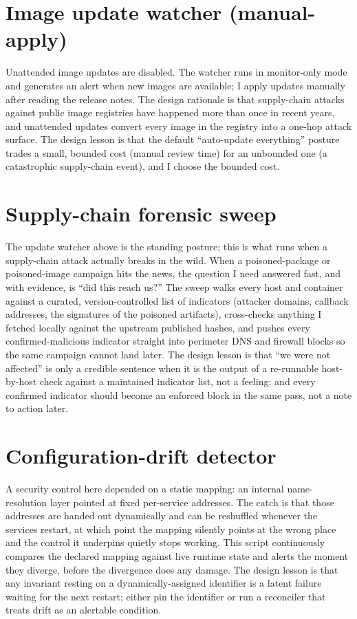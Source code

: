 \documentclass[12pt]{article}
\begin{document}
\section{Image update watcher (manual-apply)}

Unattended image updates are disabled. The watcher runs in monitor-only mode and generates an alert when new images are available; I apply updates manually after reading the release notes. The design rationale is that supply-chain attacks against public image registries have happened more than once in recent years, and unattended updates convert every image in the registry into a one-hop attack surface. The design lesson is that the default ``auto-update everything'' posture trades a small, bounded cost (manual review time) for an unbounded one (a catastrophic supply-chain event), and I choose the bounded cost.

\section{Supply-chain forensic sweep}

The update watcher above is the standing posture; this is what runs when a supply-chain attack actually breaks in the wild. When a poisoned-package or poisoned-image campaign hits the news, the question I need answered fast, and with evidence, is ``did this reach us?'' The sweep walks every host and container against a curated, version-controlled list of indicators (attacker domains, callback addresses, the signatures of the poisoned artifacts), cross-checks anything I fetched locally against the upstream published hashes, and pushes every confirmed-malicious indicator straight into perimeter DNS and firewall blocks so the same campaign cannot land later. The design lesson is that ``we were not affected'' is only a credible sentence when it is the output of a re-runnable host-by-host check against a maintained indicator list, not a feeling; and every confirmed indicator should become an enforced block in the same pass, not a note to action later.

\section{Configuration-drift detector}

A security control here depended on a static mapping: an internal name-resolution layer pointed at fixed per-service addresses. The catch is that those addresses are handed out dynamically and can be reshuffled whenever the services restart, at which point the mapping silently points at the wrong place and the control it underpins quietly stops working. This script continuously compares the declared mapping against live runtime state and alerts the moment they diverge, before the divergence does any damage. The design lesson is that any invariant resting on a dynamically-assigned identifier is a latent failure waiting for the next restart; either pin the identifier or run a reconciler that treats drift as an alertable condition.
\end{document}
